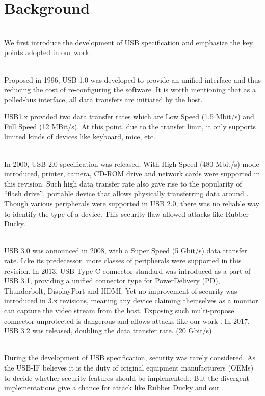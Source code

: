 \section{Background}
\label{sec:background}
\noindent{}\\
We first introduce the development of USB specification and emphasize the key points adopted in our work.

\noindent{}\\
Proposed in 1996, USB 1.0\cite{usb10} was developed to provide an unified interface and thus reducing the cost of re-configuring the software. It is worth mentioning that as a polled-bus interface, all data transfers are initiated by the host.

USB1.x\cite{usb10}\cite{usb11} provided two data transfer rates which are Low Speed (1.5 Mbit/s) and Full Speed (12 MBit/s). At this point, due to the transfer limit, it only supports limited kinds of devices like keyboard, mice, etc.

\noindent{}\\
In 2000, USB 2.0\cite{usb20} specification was released. With High Speed (480 Mbit/s) mode introduced, printer, camera, CD-ROM drive and network cards were supported in this revision. Such high data transfer rate also gave rise to the popularity of ``flash drive'', portable device that allows physically transferring data around \cite{sok}. Though various peripherals were supported in USB 2.0, there was no reliable way to identify the type of a device. This security flaw allowed attacks like Rubber Ducky\cite{rubber}.

\noindent{}\\
USB 3.0\cite{usb30} was announced in 2008, with a Super Speed (5 Gbit/s) data transfer rate. Like its predecessor, more classes of peripherals were supported in this revision. In 2013, USB Type-C connector standard was introduced as a part of USB 3.1\cite{usb31}, providing a unified connector type for PowerDelivery (PD), Thunderbolt, DisplayPort and HDMI.  Yet no improvement of security was introduced in 3.x revisions, meaning any device claiming themselves as a monitor can capture the video stream from the host. Exposing such multi-propose connector unprotected is dangerous and allows attacks like our work \tool. In 2017, USB 3.2\cite{usb32} was released, doubling the data transfer rate. (20 Gbit/s)

\noindent{}\\
During the development of USB specification, security was rarely considered.  As the USB-IF believes it is the duty of original equipment manufacturers (OEMs) to decide whether security features should be implemented.. But the divergent implementations give a chance for attack like Rubber Ducky\cite{rubber} and our \tool.